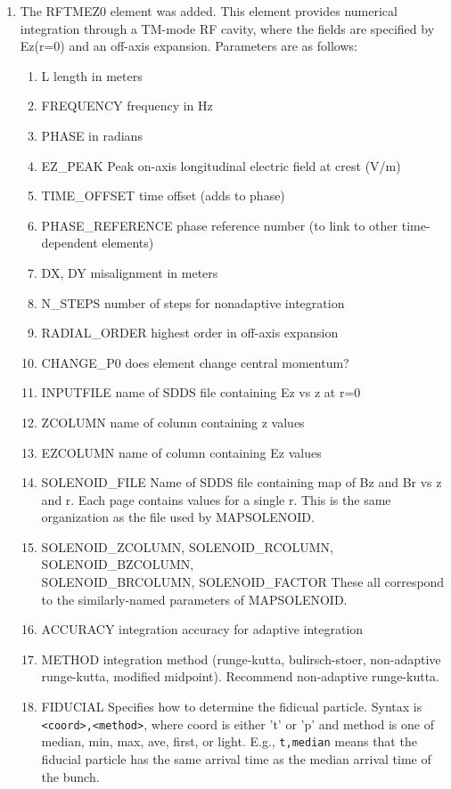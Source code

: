 \documentclass[11pt]{article}
\begin{document}
\begin{enumerate}
\item The RFTMEZ0 element was added.  This element provides numerical integration
through a TM-mode RF cavity, where the fields are specified by Ez(r=0) and an
off-axis expansion.  Parameters are as follows:
\begin{enumerate}
\item L               length in meters
\item FREQUENCY       frequency in Hz
\item PHASE           in radians
\item EZ\_PEAK         Peak on-axis longitudinal electric field at crest (V/m)
\item TIME\_OFFSET     time offset (adds to phase)
\item PHASE\_REFERENCE phase reference number (to link to other time-dependent elements)
\item DX, DY          misalignment in meters
\item N\_STEPS         number of steps for nonadaptive integration
\item RADIAL\_ORDER    highest order in off-axis expansion
\item CHANGE\_P0       does element change central momentum?
\item INPUTFILE       name of SDDS file containing Ez vs z at r=0
\item ZCOLUMN         name of column containing z values
\item EZCOLUMN        name of column containing Ez values
\item SOLENOID\_FILE   Name of SDDS file containing map of Bz and Br vs z and r.  
                Each page contains values for a single r.  This is the same
                organization as the file used by MAPSOLENOID.
\item SOLENOID\_ZCOLUMN, SOLENOID\_RCOLUMN, SOLENOID\_BZCOLUMN, \\
SOLENOID\_BRCOLUMN, SOLENOID\_FACTOR
                These all correspond to the similarly-named parameters of
                MAPSOLENOID.
\item ACCURACY        integration accuracy for adaptive integration
\item METHOD          integration method (runge-kutta, bulirsch-stoer, non-adaptive 
                runge-kutta, modified midpoint).  Recommend non-adaptive runge-kutta.
\item FIDUCIAL  Specifies how to determine the fidicual particle.  Syntax is
                \verb|<coord>,<method>|, where coord is either 't' or 'p'
                and method is one of median, min, max, ave, first, or light.  E.g., 
                \verb|t,median| means
                that the fiducial particle has the same arrival time as the
                       median arrival time of the bunch.
\end{enumerate}


\end{enumerate}
\end{document}
